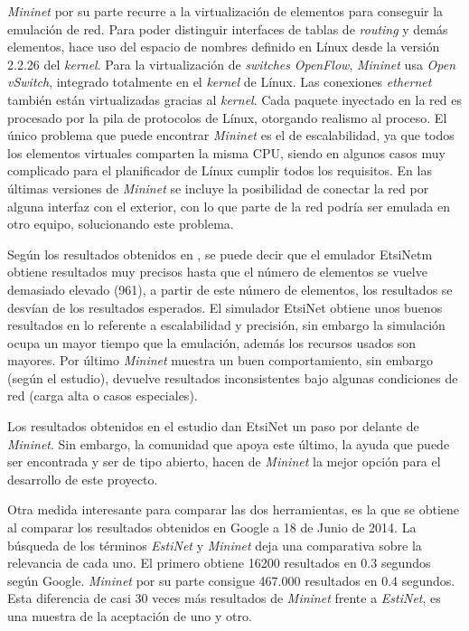 \documentclass[a4paper,11pt]{book}
\begin{document}
\emph{Mininet} por su parte recurre a la virtualización de elementos para conseguir la emulación de red. Para poder distinguir interfaces de tablas de \textit{routing} y demás elementos, hace uso del espacio de nombres definido en Línux desde la versión 2.2.26 del \textit{kernel}. Para la virtualización de \textit{switches} \emph{OpenFlow}, \emph{Mininet} usa \textit{Open vSwitch}, integrado totalmente en el \textit{kernel} de Línux. Las conexiones \textit{ethernet} también están virtualizadas gracias al \textit{kernel}. Cada paquete inyectado en la red es procesado por la pila de protocolos de Línux, otorgando realismo al proceso. El único problema que puede encontrar \emph{Mininet} es el de escalabilidad, ya que todos los elementos virtuales comparten la misma CPU, siendo en algunos casos muy complicado para el planificador de Línux cumplir todos los requisitos. En las últimas versiones de \emph{Mininet} se incluye la posibilidad de conectar la red por alguna interfaz con el exterior, con lo que parte de la red podría ser emulada en otro equipo, solucionando este problema.

Según los resultados obtenidos en \cite{wang2014comparison}, se puede decir que el emulador EtsiNetm obtiene resultados muy precisos hasta que el número de elementos se vuelve demasiado elevado (961), a partir de este número de elementos, los resultados se desvían de los resultados esperados. El simulador EtsiNet obtiene unos buenos resultados en lo referente a escalabilidad y precisión, sin embargo la simulación ocupa un mayor tiempo que la emulación, además los recursos usados son mayores. Por último \emph{Mininet} muestra un buen comportamiento, sin embargo (según el estudio), devuelve resultados inconsistentes bajo algunas condiciones de red (carga alta o casos especiales).

Los resultados obtenidos en el estudio \cite{wang2014comparison} dan EtsiNet un paso por delante de \emph{Mininet}. Sin embargo, la comunidad que apoya este último, la ayuda que puede ser encontrada y ser de tipo abierto, hacen de \emph{Mininet} la mejor opción para el desarrollo de este proyecto.

Otra medida interesante para comparar las dos herramientas, es la que se obtiene al comparar los resultados obtenidos en Google a 18 de Junio de 2014. La búsqueda de los términos \textit{EstiNet} y \emph{Mininet} deja una comparativa sobre la relevancia de cada uno. El primero obtiene 16200 resultados en 0.3 segundos según Google. \emph{Mininet} por su parte consigue 467.000 resultados en 0.4 segundos. Esta diferencia de casi 30 veces más resultados de \emph{Mininet} frente a \textit{EstiNet}, es una muestra de la aceptación de uno y otro. 
\end{document}

